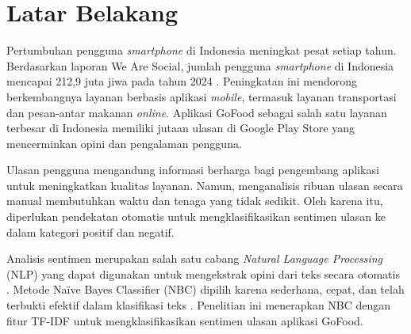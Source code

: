 \section{Latar Belakang}

Pertumbuhan pengguna \emph{smartphone} di Indonesia meningkat pesat setiap tahun. Berdasarkan laporan We Are Social, jumlah pengguna \emph{smartphone} di Indonesia mencapai 212,9 juta jiwa pada tahun 2024 \cite{manning2008}. Peningkatan ini mendorong berkembangnya layanan berbasis aplikasi \emph{mobile}, termasuk layanan transportasi dan pesan-antar makanan \emph{online}. Aplikasi GoFood sebagai salah satu layanan terbesar di Indonesia memiliki jutaan ulasan di Google Play Store yang mencerminkan opini dan pengalaman pengguna.

Ulasan pengguna mengandung informasi berharga bagi pengembang aplikasi untuk meningkatkan kualitas layanan. Namun, menganalisis ribuan ulasan secara manual membutuhkan waktu dan tenaga yang tidak sedikit. Oleh karena itu, diperlukan pendekatan otomatis untuk mengklasifikasikan sentimen ulasan ke dalam kategori positif dan negatif.

Analisis sentimen merupakan salah satu cabang \emph{Natural Language Processing} (NLP) yang dapat digunakan untuk mengekstrak opini dari teks secara otomatis \cite{feldman2013}. Metode Na\"ive Bayes Classifier (NBC) dipilih karena sederhana, cepat, dan telah terbukti efektif dalam klasifikasi teks \cite{go2019}. Penelitian ini menerapkan NBC dengan fitur TF-IDF untuk mengklasifikasikan sentimen ulasan aplikasi GoFood.
